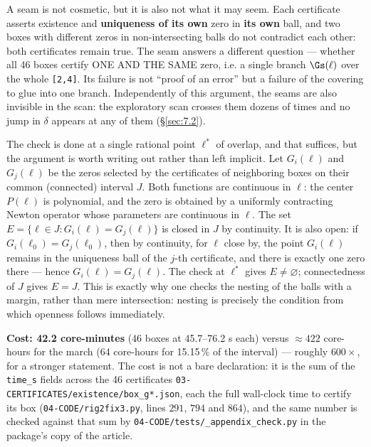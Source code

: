 A seam is not cosmetic, but it is also not what it may seem. Each certificate asserts existence and \textbf{uniqueness of its own} zero in \textbf{its own} ball, and two boxes with different zeros in non-intersecting balls do not contradict each other: both certificates remain true. The seam answers a different question --- whether all 46 boxes certify ONE AND THE SAME zero, i.e. a single branch $\Gs(\ell)$ over the whole \texttt{[2,4]}. Its failure is not ``proof of an error'' but a failure of the covering to glue into one branch. Independently of this argument, the seams are also invisible in the scan: the exploratory scan crosses them dozens of times and no jump in $\delta$ appears at any of them (\S\ref{sec:7.2}).

The check is done at a single rational point $\ell^{*}$ of overlap, and that suffices, but the argument is worth writing out rather than left implicit. Let $G_{i}(\ell)$ and $G_{j}(\ell)$ be the zeros selected by the certificates of neighboring boxes on their common (connected) interval $J$. Both functions are continuous in $\ell$: the center $P(\ell)$ is polynomial, and the zero is obtained by a uniformly contracting Newton operator whose parameters are continuous in $\ell$. The set $E = \{\ell \in J : G_{i}(\ell) = G_{j}(\ell)\}$ is closed in $J$ by continuity. It is also open: if $G_{i}(\ell_{0}) = G_{j}(\ell_{0})$, then by continuity, for $\ell$ close by, the point $G_{i}(\ell)$ remains in the uniqueness ball of the $j$-th certificate, and there is exactly one zero there --- hence $G_{i}(\ell) = G_{j}(\ell)$. The check at $\ell^{*}$ gives $E \ne \varnothing$; connectedness of $J$ gives $E = J$. This is exactly why one checks the nesting of the balls with a margin, rather than mere intersection: nesting is precisely the condition from which openness follows immediately.

\textbf{Cost: 42.2 core-minutes} (46 boxes at 45.7--76.2 s each) versus $\approx 422$ core-hours for the march (64 core-hours for 15.15\,\% of the interval) --- roughly \textbf{$600\times$}, for a stronger statement. The cost is not a bare declaration: it is the sum of the \texttt{time\_s} fields across the 46 certificates \texttt{03-\allowbreak CERTIFICATES/\allowbreak existence/\allowbreak box\_\allowbreak g*.json}, each the full wall-clock time to certify its box (\texttt{04-\allowbreak CODE/\allowbreak rig2fix3.py}, lines $291$, $794$ and $864$),
and the same number is checked against that sum by \texttt{04-\allowbreak CODE/\allowbreak tests/\allowbreak \_\allowbreak appendix\_\allowbreak check.py} in the package's copy of the article.


